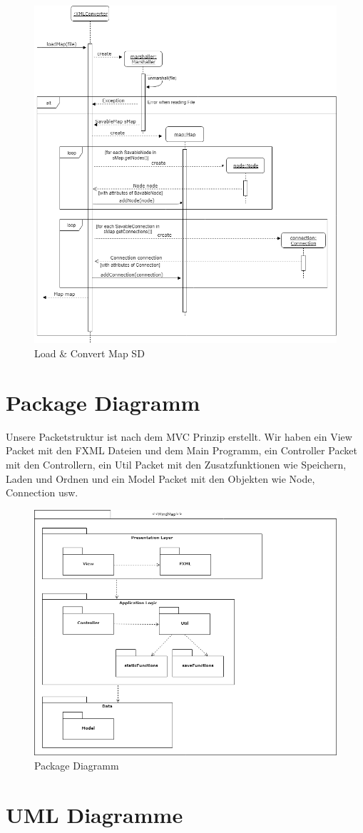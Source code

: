 \begin{figure}[H]
	\centering
		\includegraphics[scale=0.6]{images/loadConvertSD.png}
	\caption{Load \& Convert Map SD}
	\label{fig:loadConvert_SD}
\end{figure}

\section{Package Diagramm}
\label{sec:package_diagramm}
Unsere Packetstruktur ist nach dem MVC Prinzip erstellt. Wir haben ein View Packet mit den FXML Dateien und dem Main Programm, ein Controller Packet mit den Controllern, ein Util Packet mit den Zusatzfunktionen wie Speichern, Laden und Ordnen und ein Model Packet mit den Objekten wie Node, Connection usw.

\begin{figure}[H]
	\centering
		\includegraphics[scale=0.6]{images/packagediagramm.png}
	\caption{Package Diagramm}
	\label{fig:loadConvert_SD}
\end{figure}


\section{UML Diagramme}
\label{sec:uml_diagramme}